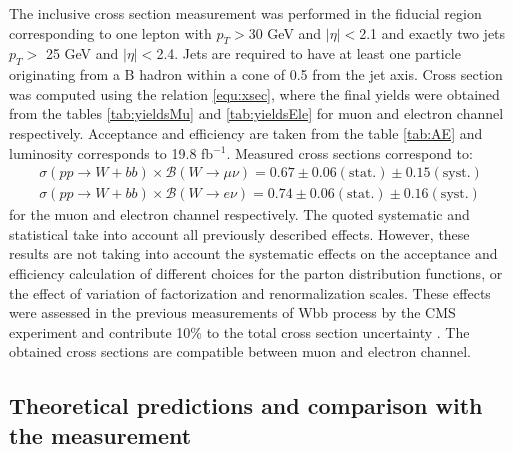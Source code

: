 The inclusive cross section measurement was performed in the fiducial region corresponding to one lepton with $p_T>$30 GeV and $|\eta|<$2.1 and exactly two jets $p_T>$ 25 GeV and $|\eta|<$2.4. Jets are required to have at least one particle originating from a B hadron within a cone of 0.5 from the jet axis. Cross section was computed using the relation \ref{equ:xsec}, where the final yields were obtained from the tables \ref{tab:yieldsMu} and \ref{tab:yieldsEle} for muon and electron channel respectively. Acceptance and efficiency are taken from the table \ref{tab:AE} and luminosity corresponds to 19.8 fb$^{-1}$. Measured cross sections correspond to:
\begin{align*}
\sigma(pp\rightarrow W+bb)\times \mathcal{B}(W\rightarrow \mu\nu) = 0.67 \pm 0.06(\mathrm{stat.}) \pm 0.15(\mathrm{syst.})\\
\sigma(pp\rightarrow W+bb)\times \mathcal{B}(W\rightarrow e\nu) = 0.74 \pm 0.06(\mathrm{stat.}) \pm 0.16(\mathrm{syst.})
\end{align*}
for the muon and electron channel respectively. The quoted systematic and statistical take into account all previously described effects. However, these results are not taking into account the systematic effects on the acceptance and efficiency calculation of different choices for the parton distribution functions, or the effect of variation of factorization and renormalization scales. These effects were assessed in the previous measurements of Wbb process by the CMS experiment and contribute 10\% to the total cross section uncertainty \cite{Chatrchyan:2013uza}. The obtained cross sections are compatible between muon and electron channel.   

\subsection{Theoretical predictions and comparison with the measurement}

